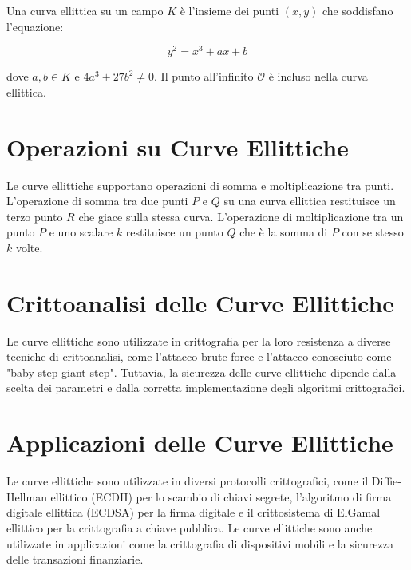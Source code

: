 \documentclass[a4paper,12pt]{report}
\begin{document}
Una curva ellittica su un campo $K$ è l'insieme dei punti $(x, y)$ che soddisfano l'equazione:

\[y^2 = x^3 + ax + b\]

dove $a, b \in K$ e $4a^3 + 27b^2 \neq 0$. Il punto all'infinito $\mathcal{O}$ è incluso nella curva ellittica.

\section{Operazioni su Curve Ellittiche}

Le curve ellittiche supportano operazioni di somma e moltiplicazione tra punti. L'operazione di somma tra due punti $P$ e $Q$ su una curva ellittica restituisce un terzo punto $R$ che giace sulla stessa curva. L'operazione di moltiplicazione tra un punto $P$ e uno scalare $k$ restituisce un punto $Q$ che è la somma di $P$ con se stesso $k$ volte.

\section{Crittoanalisi delle Curve Ellittiche}

Le curve ellittiche sono utilizzate in crittografia per la loro resistenza a diverse tecniche di crittoanalisi, come l'attacco brute-force e l'attacco conosciuto come "baby-step giant-step". Tuttavia, la sicurezza delle curve ellittiche dipende dalla scelta dei parametri e dalla corretta implementazione degli algoritmi crittografici.

\section{Applicazioni delle Curve Ellittiche}

Le curve ellittiche sono utilizzate in diversi protocolli crittografici, come il Diffie-Hellman ellittico (ECDH) per lo scambio di chiavi segrete, l'algoritmo di firma digitale ellittica (ECDSA) per la firma digitale e il crittosistema di ElGamal ellittico per la crittografia a chiave pubblica. Le curve ellittiche sono anche utilizzate in applicazioni come la crittografia di dispositivi mobili e la sicurezza delle transazioni finanziarie.

\nocite{*}


\end{document}
